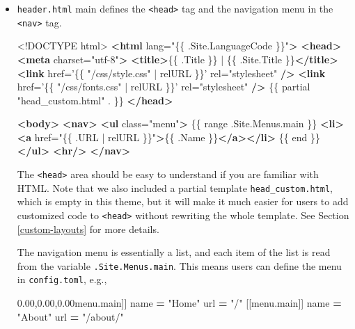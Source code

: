 \documentclass[12pt,]{krantz}
\makeatletter
\newenvironment{Shaded}{\begin{snugshade}}{\end{snugshade}}
\newcommand{\KeywordTok}[1]{\textcolor[rgb]{0.13,0.29,0.53}{\textbf{#1}}}
\newcommand{\DataTypeTok}[1]{\textcolor[rgb]{0.13,0.29,0.53}{#1}}
\newcommand{\StringTok}[1]{\textcolor[rgb]{0.31,0.60,0.02}{#1}}
\newcommand{\OtherTok}[1]{\textcolor[rgb]{0.56,0.35,0.01}{#1}}
\newcommand{\VariableTok}[1]{\textcolor[rgb]{0.00,0.00,0.00}{#1}}
\newcommand{\OperatorTok}[1]{\textcolor[rgb]{0.81,0.36,0.00}{\textbf{#1}}}
\newcommand{\AttributeTok}[1]{\textcolor[rgb]{0.77,0.63,0.00}{#1}}
\newcommand{\NormalTok}[1]{#1}
\newenvironment{kframe}{%
\medskip{}
\setlength{\fboxsep}{.8em}
 \def\at@end@of@kframe{}%
 \ifinner\ifhmode%
  \def\at@end@of@kframe{\end{minipage}}%
  \begin{minipage}{\columnwidth}%
 \fi\fi%
 \def\FrameCommand##1{\hskip\@totalleftmargin \hskip-\fboxsep
 \colorbox{shadecolor}{##1}\hskip-\fboxsep
     \hskip-\linewidth \hskip-\@totalleftmargin \hskip\columnwidth}%
 \MakeFramed {\advance\hsize-\width
   \@totalleftmargin\z@ \linewidth\hsize
   \@setminipage}}%
 {\par\unskip\endMakeFramed%
 \at@end@of@kframe}
\renewenvironment{Shaded}{\begin{kframe}}{\end{kframe}}
\theoremstyle{definition}
\theoremstyle{definition}
\theoremstyle{definition}
\theoremstyle{remark}
\makeatother
\begin{document}
\begin{itemize}
  \begin{itemize}
  \item
    \texttt{header.html} main defines the
    \texttt{\textless{}head\textgreater{}} tag and the navigation menu
    in the \texttt{\textless{}nav\textgreater{}} tag.

\begin{Shaded}
\begin{Highlighting}[]
\DataTypeTok{<!DOCTYPE }\NormalTok{html}\DataTypeTok{>}
\KeywordTok{<html}\OtherTok{ lang=}\StringTok{"\{\{ .Site.LanguageCode \}\}"}\KeywordTok{>}
  \KeywordTok{<head>}
    \KeywordTok{<meta}\OtherTok{ charset=}\StringTok{"utf-8"}\KeywordTok{>}
    \KeywordTok{<title>}\NormalTok{\{\{ .Title \}\} | \{\{ .Site.Title \}\}}\KeywordTok{</title>}
    \KeywordTok{<link}\OtherTok{ href=}\StringTok{'\{\{ "/css/style.css" | relURL \}\}'}
\OtherTok{      rel=}\StringTok{"stylesheet"} \KeywordTok{/>}
    \KeywordTok{<link}\OtherTok{ href=}\StringTok{'\{\{ "/css/fonts.css" | relURL \}\}'}
\OtherTok{      rel=}\StringTok{"stylesheet"} \KeywordTok{/>}
\NormalTok{    \{\{ partial "head_custom.html" . \}\}}
  \KeywordTok{</head>}

  \KeywordTok{<body>}
    \KeywordTok{<nav>}
    \KeywordTok{<ul}\OtherTok{ class=}\StringTok{"menu"}\KeywordTok{>}
\NormalTok{      \{\{ range .Site.Menus.main \}\}}
      \KeywordTok{<li><a}\OtherTok{ href=}\StringTok{"\{\{ .URL | relURL \}\}"}\KeywordTok{>}\NormalTok{\{\{ .Name \}\}}\KeywordTok{</a></li>}
\NormalTok{      \{\{ end \}\}}
    \KeywordTok{</ul>}
    \KeywordTok{<hr/>}
    \KeywordTok{</nav>}
\end{Highlighting}
\end{Shaded}

    The \texttt{\textless{}head\textgreater{}} area should be easy to
    understand if you are familiar with HTML. Note that we also included
    a partial template \texttt{head\_custom.html}, which is empty in
    this theme, but it will make it much easier for users to add
    customized code to \texttt{\textless{}head\textgreater{}} without
    rewriting the whole template. See Section \ref{custom-layouts} for
    more details.

    The navigation menu is essentially a list, and each item of the list
    is read from the variable \texttt{.Site.Menus.main}. This means
    users can define the menu in \texttt{config.toml}, e.g.,

\begin{Shaded}
\begin{Highlighting}[]
\NormalTok{[[}\VariableTok{menu}\NormalTok{.}\AttributeTok{main}\NormalTok{]]}
\NormalTok{    name }\OperatorTok{=} \StringTok{"Home"}
\NormalTok{    url }\OperatorTok{=} \StringTok{"/"}
\NormalTok{[[}\VariableTok{menu}\NormalTok{.}\AttributeTok{main}\NormalTok{]]}
\NormalTok{    name }\OperatorTok{=} \StringTok{"About"}
\NormalTok{    url }\OperatorTok{=} \StringTok{"/about/"}
\end{Highlighting}
\end{Shaded}


\end{itemize}
\end{itemize}
\end{document}
